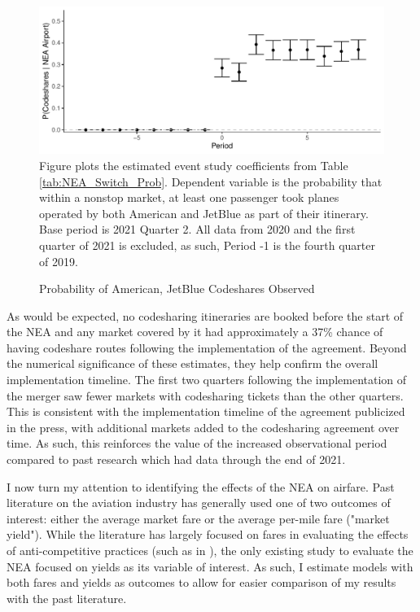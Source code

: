 \documentclass{article}
\begin{document}
    \begin{figure}
		\caption{Probability of American, JetBlue Codeshares Observed}
		\label{fig:NEA_Switch_Graph}
        \begin{center}
        \includegraphics[width =\linewidth]{NEA_Probability_Switches_Graph}
		\footnotesize{Figure plots the estimated event study coefficients from Table \ref{tab:NEA_Switch_Prob}. Dependent variable is the probability that within a nonstop market, at least one passenger took planes operated by both American and JetBlue as part of their itinerary. Base period is 2021 Quarter 2. All data from 2020 and the first quarter of 2021 is excluded, as such,  Period -1 is the fourth quarter of 2019.}
        \end{center}
	\end{figure}

	As would be expected, no codesharing itineraries are booked before the start of the NEA and any market covered by it had approximately a 37\% chance of having codeshare routes following the implementation of the agreement. Beyond the numerical significance of these estimates, they help confirm the overall implementation timeline. The first two quarters following the implementation of the merger saw fewer markets with codesharing tickets than the other quarters. This is consistent with the implementation timeline of the agreement publicized in the press, with additional markets added to the codesharing agreement over time. As such, this reinforces the value of the increased observational period compared to past research which had data through the end of 2021. 
	
	I now turn my attention to identifying the effects of the NEA on airfare. Past literature on the aviation industry has generally used one of two outcomes of interest: either the average market fare or the average per-mile fare ("market yield").  While the literature has largely focused on fares in evaluating the effects of anti-competitive practices (such as in \citet{luo_price_2014, carlton_are_2019}), the only existing study \citep{zou_assessing_2023} to evaluate the NEA focused on yields as its variable of interest. As such, I estimate models with both fares and yields as outcomes to allow for easier comparison of my results with the past literature. 
\end{document}
